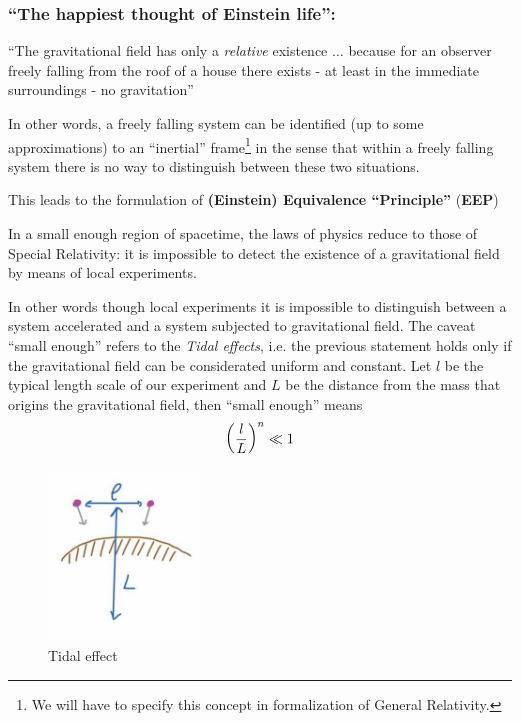 \documentclass[../main/main.tex]{subfiles}
\begin{document}
\subsubsection{``The happiest thought of Einstein life'':}
\begin{mdframed}[style=mybox]
``The gravitational field has only a \emph{relative} existence $\dots$ because for an observer freely falling from the roof of a house there exists - at least in the immediate surroundings - no gravitation''
\end{mdframed}

In other words, a freely falling system can be identified (up to some approximations) to an ``inertial'' frame\footnote{We will have to specify this concept in formalization of General Relativity.} in the sense that within a freely falling system there is no way to distinguish between these two situations. 

This leads to the formulation of \textbf{(Einstein) Equivalence ``Principle''} (\textbf{EEP})
\begin{mdframed}[style=mybox]
In a small enough region of spacetime, the laws of physics reduce to those of Special Relativity: it is impossible to detect the existence of a gravitational field by means of local experiments.
\end{mdframed}

In other words though local experiments it is impossible to distinguish between a system accelerated and a system subjected to gravitational field.
The caveat ``small enough'' refers to the \emph{Tidal effects}, i.e. the previous statement holds only if the gravitational field can be considerated uniform and constant. Let $l$ be the typical length scale of our experiment and $L$ be the distance from the mass that origins the gravitational field, then ``small enough'' means
\[\left(\frac lL\right)^n\ll1\]

\begin{figure}[H]
\centering
\includegraphics[width=4cm]{../img/Tidal-effect.jpg}
\caption{Tidal effect}
\end{figure}
\end{document}

